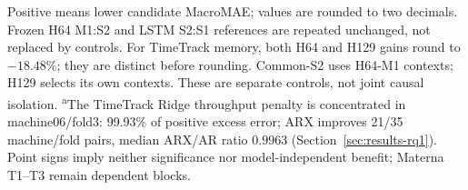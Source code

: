 \begin{table}[t]
\begin{tabular*}{\textwidth}{@{\extracolsep{\fill}}lrrrr@{}}
    \bottomrule
  \end{tabular*}
  \vspace{2pt}
  \parbox{\textwidth}{\footnotesize Positive means lower candidate MacroMAE; values are rounded to two decimals.
  Frozen H64 M1:S2 and LSTM S2:S1 references are repeated unchanged, not replaced by controls.
  For TimeTrack memory, both H64 and H129 gains round to $-18.48\%$; they are distinct before rounding.
  Common-S2 uses H64-M1 contexts; H129 selects its own contexts. These are separate controls, not joint causal isolation.
  \textsuperscript{a}The TimeTrack Ridge throughput penalty is concentrated in machine06/fold3:
  99.93\% of positive excess error; ARX improves 21/35 machine/fold pairs, median ARX/AR ratio $0.9963$ (Section~\ref{sec:results-rq1}).
  Point signs imply neither significance nor model-independent benefit; Materna T1--T3 remain dependent blocks.}
\end{table}
